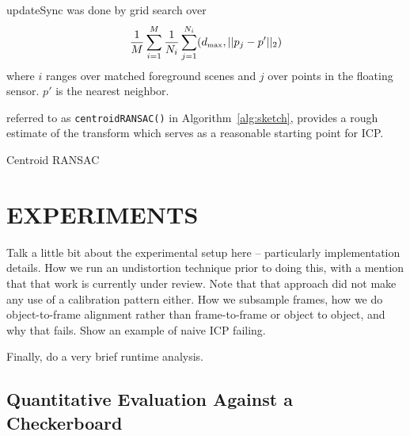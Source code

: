 \documentclass[letterpaper, 10 pt, conference]{ieeeconf}  %
\begin{document}
updateSync was done by grid search over
\newcommand{\dmax}{d_{\mbox{\tiny{max}}}}
\begin{align*}
  \frac{1}{M} \sum_{i=1}^M \frac{1}{N_i} \sum_{j=1}^{N_i}    (\dmax, ||p_j - p'||_2)
\end{align*}
where $i$ ranges over matched foreground scenes and $j$ over points in the floating sensor.  $p'$ is the nearest neighbor.


referred to as \texttt{centroidRANSAC()} in Algorithm~\ref{alg:sketch}, provides a rough estimate of the transform which serves as a reasonable starting point for ICP.


\begin{algorithm}
  \caption{Centroid RANSAC}
  \label{alg:cal}
  \SetLine
  \phantom{\;}
\end{algorithm}



\section{EXPERIMENTS}

Talk a little bit about the experimental setup here -- particularly implementation details. How we run an undistortion technique 
prior to doing this, with a mention that that work is currently under review. Note that that approach did not make any use of a 
calibration pattern either. How we subsample frames, 
how we do object-to-frame alignment rather than frame-to-frame or object to object, and why that fails. Show an example of naive ICP failing.

Finally, do a very brief runtime analysis.

\subsection{Quantitative Evaluation Against a Checkerboard}
\end{document}
